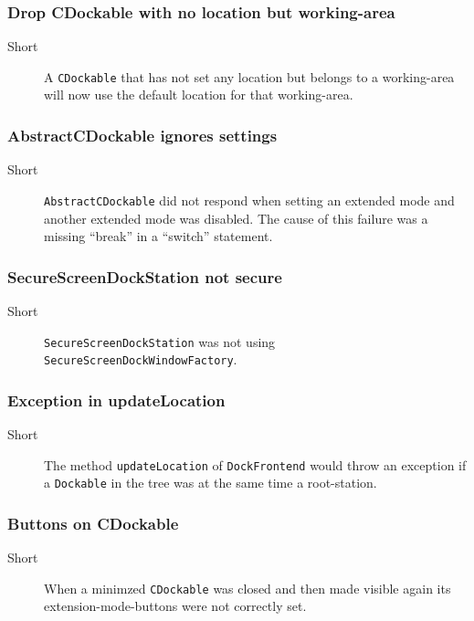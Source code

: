 \documentclass[a4paper,10pt]{article}
\newcommand{\src}[1]{\lstinline[basicstyle=\normalsize\ttfamily,keywordstyle=\normalsize\ttfamily,identifierstyle=\normalsize\ttfamily]|#1|}
\newcommand{\short}{\item[Short]}
\begin{document}
\subsubsection{Drop CDockable with no location but working-area}
\begin{description}
 \short A \src{CDockable} that has not set any location but belongs to a working-area will now use the default location for that working-area.
\end{description}

\subsubsection{AbstractCDockable ignores settings}
\begin{description}
 \short \src{AbstractCDockable} did not respond when setting an extended mode and another extended mode was disabled. The cause of this failure was a missing ``break'' in a ``switch'' statement.
\end{description}

\subsubsection{SecureScreenDockStation not secure}
\begin{description}
 \short \src{SecureScreenDockStation} was not using \linebreak \src{SecureScreenDockWindowFactory}.
\end{description}

\subsubsection{Exception in updateLocation}
\begin{description}
 \short The method \src{updateLocation} of \src{DockFrontend} would throw an exception if a \src{Dockable} in the tree was at the same time a root-station.
\end{description}

\subsubsection{Buttons on CDockable}
\begin{description}
 \short When a minimzed \src{CDockable} was closed and then made visible again its extension-mode-buttons were not correctly set.
\end{description}
\end{document}
